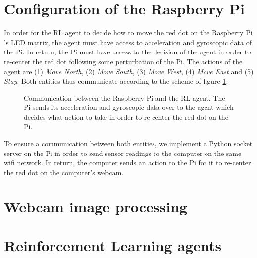 \section{Configuration of the Raspberry Pi}

In order for the RL agent to decide how to move the red dot on the Raspberry Pi 's LED matrix, the agent must have access to acceleration and gyroscopic data of the Pi. In return, the Pi must have access to the decision of the agent in order to re-center the red dot following some perturbation of the Pi. The actions of the agent are (1) \textit{Move North}, (2) \textit{Move South}, (3) \textit{Move West}, (4) \textit{Move East} and (5) \textit{Stay}. Both entities thus communicate according to the scheme of figure \ref{communication}.

\begin{figure}

\centering


\caption{Communication between the Raspberry Pi and the RL agent. The Pi sends its acceleration and gyroscopic data over to the agent which decides what action to take in order to re-center the red dot on the Pi.} 
\label{communication}
\end{figure}

To ensure a communication between both entities, we implement a Python socket server on the Pi in order to send sensor readings to the computer on the same wifi network. In return, the computer sends an action to the Pi for it to re-center the red dot on the computer's webcam.

\section{Webcam image processing}

\section{Reinforcement Learning agents}
